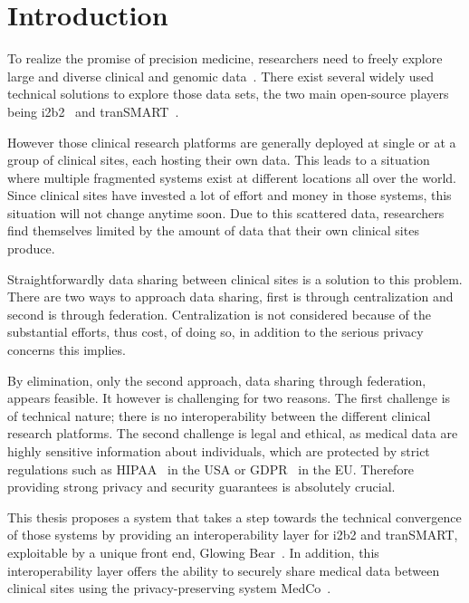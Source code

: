 \chapter{Introduction}

To realize the promise of precision medicine, researchers need to freely explore large and diverse clinical and genomic data~\cite{scollen2017data}.
There exist several widely used technical solutions to explore those data sets, the two main open-source players being i2b2~\cite{murphy2010serving} and tranSMART~\cite{scheufele2014transmart}.

However those clinical research platforms are generally deployed at single or at a group of clinical sites, each hosting their own data.
This leads to a situation where multiple fragmented systems exist at different locations all over the world. Since clinical sites have invested a lot of effort and money in those systems, this situation will not change anytime soon.
Due to this scattered data, researchers find themselves limited by the amount of data that their own clinical sites produce.

Straightforwardly data sharing between clinical sites is a solution to this problem.
There are two ways to approach data sharing, first is through centralization and second is through federation.
Centralization is not considered because of the substantial efforts, thus cost, of doing so, in addition to the serious privacy concerns this implies.

By elimination, only the second approach, data sharing through federation, appears feasible.
It however is challenging for two reasons.
The first challenge is of technical nature; there is no interoperability between the different clinical research platforms.
The second challenge is legal and ethical, as medical data are highly sensitive information about individuals, which are protected by strict regulations such as HIPAA~\cite{centers2003hipaa} in the USA or GDPR~\cite{gdpr} in the EU.
Therefore providing strong privacy and security guarantees is absolutely crucial.

This thesis proposes a system that takes a step towards the technical convergence of those systems by providing an interoperability layer for i2b2 and tranSMART, exploitable by a unique front end, Glowing Bear~\cite{gb}.
In addition, this interoperability layer offers the ability to securely share medical data between clinical sites using the privacy-preserving system MedCo~\cite{medco}.



